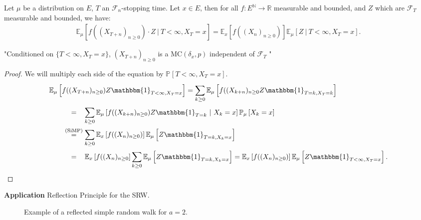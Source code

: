 \begin{theorem}
	Let $\mu $ be a distribution on $E$, $T$ an $ \mathcal{F}_n$-stopping time. Let $x \in E$,
	then for all $f:E^{\mathbb{N}} \to \mathbb{R}$ measurable and bounded, and $Z$ which are $ \mathcal{F}_T$ measurable and bounded, we have:
\begin{align}
	\boxed{ \mathbb{E}_{\mu } \left[ f((X_{T+n})_{n\geq 0}) \cdot Z \ | \ T<\infty, X_T=x \right] = \mathbb{E}_{x} \left[ f((X_n)_{n\geq 0}) \right]  \mathbb{E}_{\mu } \left[ Z \ | \ T<\infty, X_T=x \right].} 
\end{align}
\end{theorem}
\noindent
"Conditioned on $\{T<\infty,X_T=x\}$, $(X_{T+n})_{n\geq 0}$ is a $ \textrm{MC}(\delta_x,p)$ independent of $ \mathcal{F}_T$ "
\begin{proof}
We will multiply each side of the equation by $\mathbb{P}_{} \left[ T < \infty, X_T =x \right]$.
\begin{align}
&	\mathbb{E}_{\mu } \left[ f((X_{T+n})_{n\geq 0})Z \mathbbm{1}_{T<\infty, X_T=x}  \right] =
		\sum_{k\geq 0}^{} \mathbb{E}_{\mu } \left[ f((X_{k+n})_{n\geq 0} Z \mathbbm{1}_{T=k, X_T=k}  \right] \\
&\qquad	\stackrel{\phantom{\text{(SiMP)}}}{=}  \sum_{k\geq 0}^{} \mathbb{E}_{\mu } \left[ f((X_{k+n})_{n\geq 0}) Z \mathbbm{1}_{T=k} \ | \ X_k = x \right] \mathbb{P}_{\mu } \left[ X_k = x  \right] \\ 
&\qquad	\stackrel{\text{(SiMP)}}{=} \sum_{k\geq 0}^{} \mathbb{E}_{x} \left[ f((X_{n})_{n\geq 0}) \right] \mathbb{E}_{\mu } \left[ Z \mathbbm{1}_{T=k, X_k = x}  \right] \\
&\qquad	\stackrel{\phantom{\text{(SiMP)}}}{=} \mathbb{E}_{x} \left[ f((X_n)_{n\geq 0} \right] \sum_{k\geq 0}^{} \mathbb{E}_{\mu } \left[ Z \mathbbm{1}_{T=k, X_k=x}  \right]  
		= \mathbb{E}_{x} \left[ f((X_n)_{n\geq 0}) \right] \mathbb{E}_{\mu } \left[ Z \mathbbm{1}_{T<\infty, X_T=x}  \right] 
.\end{align}
\end{proof}


\noindent
\textbf{Application} Reflection Principle for the SRW.
\begin{figure}[h!]
\begin{center}
\end{center}
\caption{Example of a reflected simple random walk for $a=2$.}
\end{figure}

